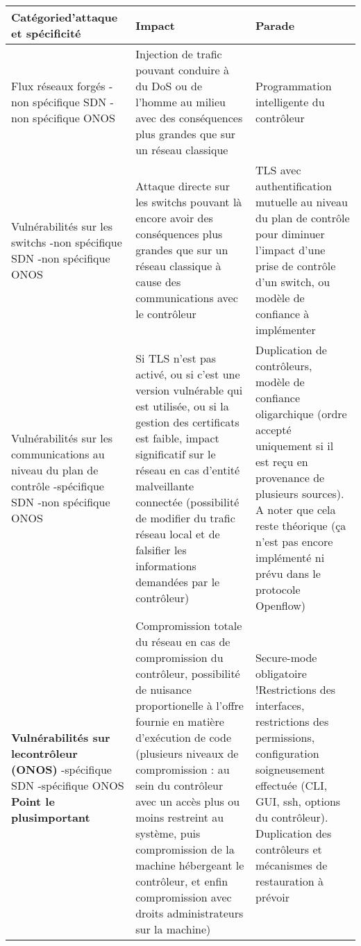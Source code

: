 \begin{small}

\begin{longtable}{| p{} | p{} | p{}|}

\hline
\textbf{Catégorie\newline d'attaque et spécificité} & \textbf{Impact} & \textbf{Parade} \\
\hline
Flux réseaux forgés \newline -non spécifique SDN \newline -non spécifique ONOS & Injection de trafic pouvant conduire à du DoS ou de l'homme au milieu avec des conséquences plus grandes que sur un réseau classique & Programmation intelligente du contrôleur\\ 
\hline
Vulnérabilités sur les \newline switchs \newline -non spécifique SDN \newline -non spécifique ONOS & Attaque directe sur les switchs pouvant là encore avoir des conséquences plus grandes que sur un réseau classique à cause des communications avec le contrôleur & TLS avec authentification mutuelle au niveau du plan de contrôle pour diminuer l'impact d'une prise de contrôle d'un switch, ou modèle de confiance à implémenter\\ 
\hline
Vulnérabilités sur les communications au niveau du plan de contrôle \newline -spécifique SDN \newline -non spécifique ONOS &  Si TLS n'est pas activé, ou si c'est une version vulnérable qui est utilisée, ou si la gestion des certificats est faible, impact significatif sur le réseau en cas d'entité malveillante connectée (possibilité de modifier du trafic réseau local et de falsifier les informations demandées par le contrôleur) & Duplication de contrôleurs, modèle de confiance oligarchique (ordre accepté uniquement si il est reçu en provenance de plusieurs sources). A noter que cela reste théorique (ça n'est pas encore implémenté ni prévu dans le protocole Openflow)\\ 
\hline
\textbf{Vulnérabilités sur le\newline contrôleur (ONOS)} \newline -spécifique SDN \newline -spécifique ONOS \newline \newline \textbf{Point le plus\newline important} & Compromission totale du réseau en cas de compromission du contrôleur, possibilité de nuisance proportionelle à l'offre fournie en matière d'exécution de code (plusieurs niveaux de compromission : au sein du contrôleur avec un accès plus ou moins restreint au système, puis compromission de la machine hébergeant le contrôleur, et enfin compromission avec droits administrateurs sur la machine)  & Secure-mode obligatoire !\newline Restrictions des interfaces, restrictions des permissions, configuration soigneusement effectuée (CLI, GUI, ssh, options du contrôleur). Duplication des contrôleurs et mécanismes de restauration à prévoir\\ 

\end{longtable}
\end{small}
